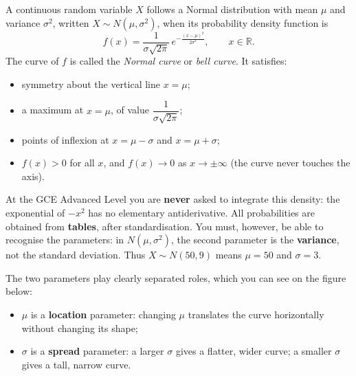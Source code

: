 \documentclass[11pt]{article}
\newcommand{\cle}[1]{{\popxbold\color{popdark}#1}}
\begin{document}
\begin{definition}
A continuous random variable $X$ follows a \cle{Normal distribution} with mean $\mu$ and variance $\sigma^2$, written $X \sim N(\mu, \sigma^2)$, when its probability density function is
\[ f(x) = \frac{1}{\sigma\sqrt{2\pi}}\, e^{-\frac{(x-\mu)^2}{2\sigma^2}}, \qquad x \in \mathbb{R}. \]
The curve of $f$ is called the \emph{Normal curve} or \emph{bell curve}. It satisfies:
\begin{itemize}
\item symmetry about the vertical line $x = \mu$;
\item a maximum at $x = \mu$, of value $\dfrac{1}{\sigma\sqrt{2\pi}}$;
\item points of inflexion at $x = \mu - \sigma$ and $x = \mu + \sigma$;
\item $f(x) > 0$ for all $x$, and $f(x) \to 0$ as $x \to \pm\infty$ (the curve never touches the axis).
\end{itemize}
\end{definition}

\begin{attention}
At the GCE Advanced Level you are \textbf{never} asked to integrate this density: the exponential of $-x^2$ has no elementary antiderivative. All probabilities are obtained from \textbf{tables}, after standardisation. You must, however, be able to recognise the parameters: in $N(\mu, \sigma^2)$, the second parameter is the \textbf{variance}, not the standard deviation. Thus $X \sim N(50, 9)$ means $\mu = 50$ and $\sigma = 3$.
\end{attention}

The two parameters play clearly separated roles, which you can see on the figure below:
\begin{itemize}
\item $\mu$ is a \textbf{location} parameter: changing $\mu$ translates the curve horizontally without changing its shape;
\item $\sigma$ is a \textbf{spread} parameter: a larger $\sigma$ gives a flatter, wider curve; a smaller $\sigma$ gives a tall, narrow curve.
\end{itemize}
\end{document}
